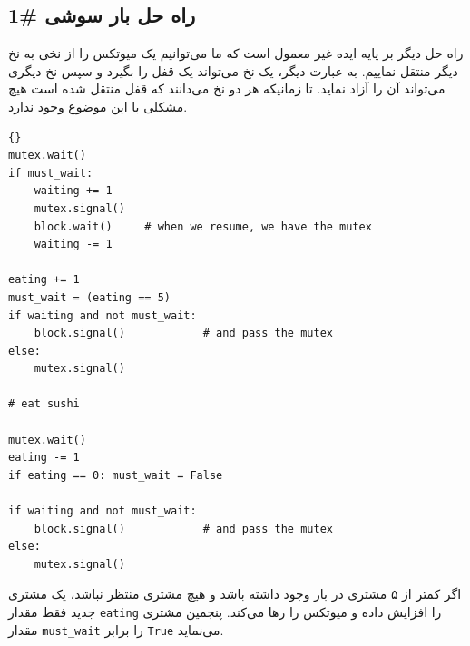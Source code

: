 \documentclass{book}
\newcommand{\clearemptydoublepage}{\newpage\cleardoublepage}
\begin{document}
\clearemptydoublepage
\subsection{راه حل بار سوشی  \#1}

     راه حل دیگر  بر پایه ایده غیر معمول است که ما می‌توانیم یک میوتکس را از نخی به نخ دیگر منتقل نماییم. 
     به عبارت دیگر، یک نخ می‌تواند یک قفل را بگیرد و سپس نخ دیگری می‌تواند آن را آزاد نماید. تا زمانیکه هر دو نخ می‌دانند که قفل منتقل شده است 
     هیچ مشکلی با این موضوع وجود ندارد. 

\begin{latin}
\begin{lstlisting}[title=\rl{راه حل بار سوشی  \#2}]{}
mutex.wait()
if must_wait:
    waiting += 1
    mutex.signal()
    block.wait()     # when we resume, we have the mutex
    waiting -= 1

eating += 1
must_wait = (eating == 5)
if waiting and not must_wait:
    block.signal()            # and pass the mutex
else:
    mutex.signal()

# eat sushi

mutex.wait()
eating -= 1
if eating == 0: must_wait = False

if waiting and not must_wait:
    block.signal()            # and pass the mutex
else:
    mutex.signal()
\end{lstlisting}
\end{latin}


    اگر کمتر از ۵ مشتری در بار وجود داشته باشد و هیچ مشتری منتظر نباشد، یک مشتری جدید فقط مقدار {\tt eating} را افزایش داده و میوتکس را رها می‌کند. 
    پنجمین مشتری مقدار {\tt must\_wait} را برابر \texttt{True} می‌نماید. 
\end{document}
